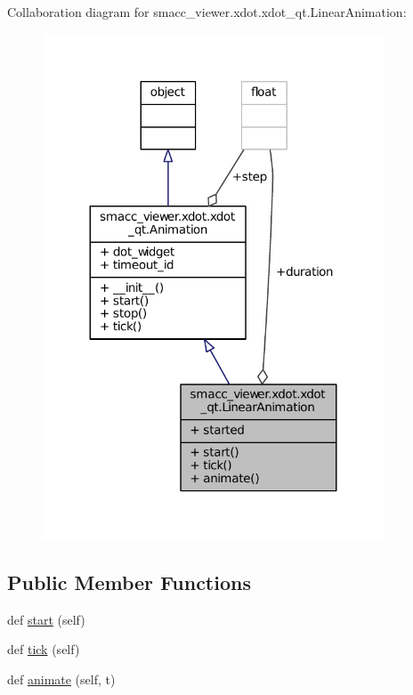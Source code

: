 Collaboration diagram for smacc\+\_\+viewer.\+xdot.\+xdot\+\_\+qt.\+Linear\+Animation\+:
\nopagebreak
\begin{figure}[H]
\begin{center}
\leavevmode
\includegraphics[width=287pt]{classsmacc__viewer_1_1xdot_1_1xdot__qt_1_1LinearAnimation__coll__graph}
\end{center}
\end{figure}
\subsection*{Public Member Functions}
\begin{DoxyCompactItemize}
\item 
def \hyperlink{classsmacc__viewer_1_1xdot_1_1xdot__qt_1_1LinearAnimation_a53c7131341f66984d0a253c9fcb7c490}{start} (self)
\item 
def \hyperlink{classsmacc__viewer_1_1xdot_1_1xdot__qt_1_1LinearAnimation_a224f062fb13cf6aa0026cb8c46f215e3}{tick} (self)
\item 
def \hyperlink{classsmacc__viewer_1_1xdot_1_1xdot__qt_1_1LinearAnimation_ab97a29a1d45052b7315bb8a89028d3b2}{animate} (self, t)
\end{DoxyCompactItemize}

